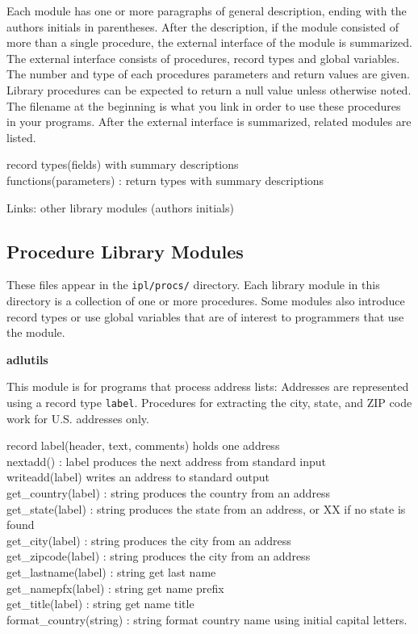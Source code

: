 Each module has one or more paragraphs of general description, ending
with the authors{\textquotesingle} initials in parentheses. After the
description, if the module consisted of more than a single procedure,
the external interface of the module is summarized. The external
interface consists of procedures, record types and global variables.
The number and type of each procedure{\textquotesingle}s parameters and
return values are given. Library procedures can be expected to return a
null value unless otherwise noted. The filename at the beginning is
what you link in order to use these procedures in your
programs. After the external interface is summarized, related modules
are listed.

record types(fields) with summary descriptions\\
functions(parameters) : return types with summary descriptions

Links: other library modules (author{\textquotesingle}s initials)

\subsection{Procedure Library Modules}
These files appear in the \texttt{ipl/procs/} directory. Each library
module in this directory is a collection of one or more procedures.
Some modules also introduce record types or use global variables that
are of interest to programmers that use the module.

{\sffamily\bfseries
adlutils}

This module is for programs that process address lists: Addresses are
represented using a record type \texttt{label}. Procedures for
extracting the city, state, and ZIP code work for U.S. addresses only.

\textsf{record label(header, text, comments)} holds one address\\
\textsf{nextadd() : label} produces the next address from standard
input\\
\textsf{writeadd(label)} writes an address to standard output\\
\textsf{get\_country(label) : string} produces the country from an
address\\
\textsf{get\_state(label) : string} produces the state from an address,
or \textsf{{\textquotedbl}XX{\textquotedbl}} if no state is
found\\
\textsf{get\_city(label) : string} produces the city from an
address\\
\textsf{get\_zipcode(label) : string} produces the city from an
address\\
\textsf{get\_lastname(label) : string} get last name\\
\textsf{get\_namepfx(label) : string} get name prefix\\
\textsf{get\_title(label) : string} get name title\\
\textsf{format\_country(string) : string} format country name using
initial capital letters.

